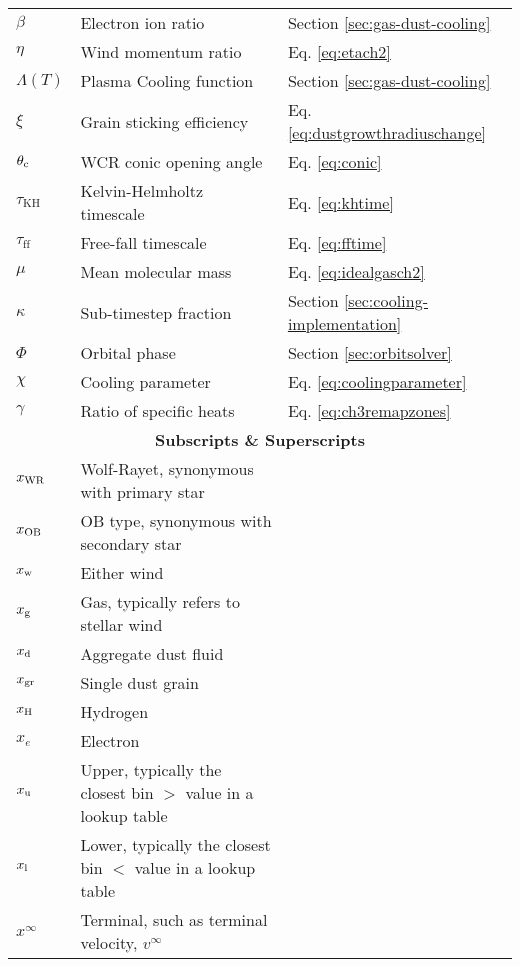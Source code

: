 \begin{Common_Symbols}
\begin{longtable}[c]{lll}

  $\beta$ & Electron ion ratio & Section \ref{sec:gas-dust-cooling} \\
  $\eta$ & Wind momentum ratio  & Eq. \ref{eq:etach2} \\
  
  $\Lambda(T)$ & Plasma Cooling function & Section \ref{sec:gas-dust-cooling} \\

  $\xi$ & Grain sticking efficiency & Eq. \ref{eq:dustgrowthradiuschange} \\

  $\theta_\text{c}$ & WCR conic opening angle & Eq. \ref{eq:conic} \\
  
  $\tau_\text{KH}$ & Kelvin-Helmholtz timescale & Eq. \ref{eq:khtime} \\
  $\tau_\text{ff}$ & Free-fall timescale & Eq. \ref{eq:fftime} \\

  $\mu$ & Mean molecular mass & Eq. \ref{eq:idealgasch2} \\

  $\kappa$ & Sub-timestep fraction & Section \ref{sec:cooling-implementation} \\

  $\Phi$ & Orbital phase & Section \ref{sec:orbitsolver} \\

  $\chi$ & Cooling parameter  & Eq. \ref{eq:coolingparameter} \\

  $\gamma$ & Ratio of specific heats & Eq. \ref{eq:ch3remapzones} \\

  \hline
  \multicolumn{3}{c}{\textbf{Subscripts \& Superscripts}} \\
  \hline

  $x_\text{WR}$   & Wolf-Rayet, synonymous with primary star & \\
  $x_\text{OB}$   & OB type, synonymous with secondary star & \\
  $x_\text{w}$    & Either wind & \\
  $x_\text{g}$    & Gas, typically refers to stellar wind & \\
  $x_\text{d}$    & Aggregate dust fluid & \\
  $x_\text{gr}$   & Single dust grain & \\
  $x_\text{H}$    & Hydrogen & \\
  $x_e$         & Electron & \\
  $x_\text{u}$    & Upper, typically the closest bin $>$ value in a lookup table & \\
  $x_\text{l}$    & Lower, typically the closest bin $<$ value in a lookup table & \\
  $x^\infty$    & Terminal, such as terminal velocity, $v^\infty$ & \\


\end{longtable}
\end{Common_Symbols}
